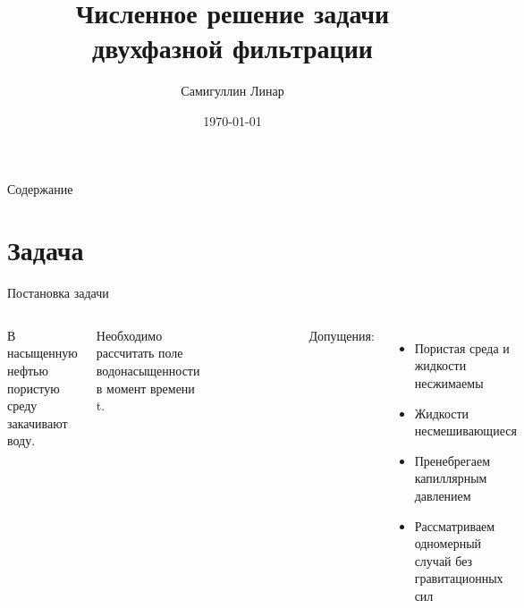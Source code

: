 \documentclass[14pt, aspectratio=169]{beamer}
\title{Численное решение задачи двухфазной фильтрации}
\author{Самигуллин Линар}
\institute{МФТИ, Роснефть}
\date{\today}
\begin{document}
\maketitle

\begin{frame} {Содержание}

    \tableofcontents

\end{frame}

\section{Задача}

\begin{frame} {Постановка задачи}

    \begin{columns}
        В насыщенную нефтью пористую среду закачивают воду.

        Необходимо рассчитать поле водонасыщенности в момент времени t.

        \begin{figure}
            \includegraphics[width=0.7\linewidth]{scheme-image-filtration.jpg}
        \end{figure}

         Допущения:
            \begin{itemize}
                \item Пористая среда и жидкости несжимаемы
                \item Жидкости несмешивающиеся
                \item Пренебрегаем капиллярным давлением
                \item Рассматриваем одномерный случай без гравитационных сил
            \end{itemize}
    \end{columns}

\end{frame}
\end{document}
